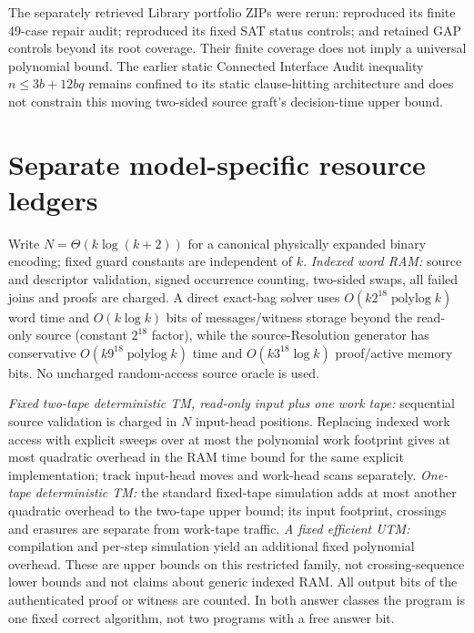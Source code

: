 \documentclass[11pt]{article}
\begin{document}
The separately retrieved Library portfolio ZIPs were rerun:  reproduced its finite 49-case repair audit;  reproduced its fixed SAT status controls; and  retained GAP controls beyond its root coverage. Their finite coverage does not imply a universal polynomial bound. The earlier static Connected Interface Audit inequality $n\le3b+12bq$ remains confined to its static clause-hitting architecture and does not constrain this moving two-sided source graft's decision-time upper bound.

\section{Separate model-specific resource ledgers}
Write $N=\Theta(k\log(k+2))$ for a canonical physically expanded binary encoding; fixed guard constants are independent of $k$. \emph{Indexed word RAM:} source and descriptor validation, signed occurrence counting, two-sided swaps, all failed joins and proofs are charged. A direct exact-bag solver uses $O(k2^{18}\operatorname{polylog}k)$ word time and $O(k\log k)$ bits of messages/witness storage beyond the read-only source (constant $2^{18}$ factor), while the source-Resolution generator has conservative $O(k9^{18}\operatorname{polylog}k)$ time and $O(k3^{18}\log k)$ proof/active memory bits. No uncharged random-access source oracle is used.

\emph{Fixed two-tape deterministic TM, read-only input plus one work tape:} sequential source validation is charged in $N$ input-head positions. Replacing indexed work access with explicit sweeps over at most the polynomial work footprint gives at most quadratic overhead in the RAM time bound for the same explicit implementation; track input-head moves and work-head scans separately. \emph{One-tape deterministic TM:} the standard fixed-tape simulation adds at most another quadratic overhead to the two-tape upper bound; its input footprint, crossings and erasures are separate from work-tape traffic. \emph{A fixed efficient UTM:} compilation and per-step simulation yield an additional fixed polynomial overhead. These are upper bounds on this restricted family, not crossing-sequence lower bounds and not claims about generic indexed RAM. All output bits of the authenticated proof or witness are counted. In both answer classes the program is one fixed correct algorithm, not two programs with a free answer bit.
\end{document}
